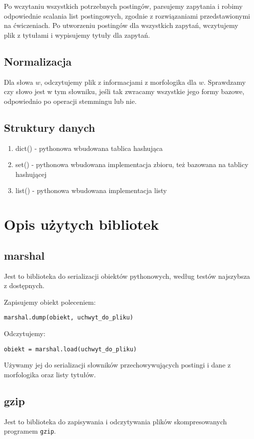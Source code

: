 \documentclass[11pt]{article}
\begin{document}
Po wczytaniu wszystkich potrzebnych postingów, parsujemy zapytania i robimy odpowiednie scalania list postingowych, zgodnie z rozwiązaniami przedstawionymi na ćwiczeniach. Po utworzeniu postingów dla wszystkich zapytań, wczytujemy plik z tytułami i wypisujemy tytuły dla zapytań. 
\subsection{Normalizacja}
Dla słowa $w$, odczytujemy plik z informacjami z morfologika dla $w$. Sprawdzamy czy słowo jest w tym słowniku,
jeśli tak zwracamy wszystkie jego formy bazowe, odpowiednio po operacji stemmingu lub nie.
\subsection{Struktury danych}
\begin{enumerate}
\item dict() - pythonowa wbudowana tablica hashująca
\item set() - pythonowa wbudowana implementacja zbioru, też bazowana na tablicy hashującej
\item list() - pythonowa wbudowana implementacja listy
\end{enumerate}
\section{Opis użytych bibliotek}
\subsection{marshal}
Jest to biblioteka do serializacji obiektów pythonowych, według testów najszybsza z dostępnych.

Zapisujemy obiekt poleceniem:
\begin{verbatim}
marshal.dump(obiekt, uchwyt_do_pliku)
\end{verbatim}
Odczytujemy:
\begin{verbatim}
obiekt = marshal.load(uchwyt_do_pliku)
\end{verbatim}

Używamy jej do serializacji słowników przechowywujących postingi i dane z morfologika oraz listy tytułów.
\subsection{gzip}
Jest to biblioteka do zapisywania i odczytywania plików skompresowanych programem \texttt{gzip}.
\end{document}
